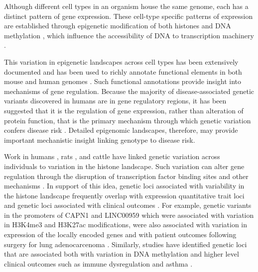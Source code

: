 \documentclass[
  11pt,
]{article}
\begin{document}
Although different cell types in an organism house the same genome, each
has a distinct pattern of gene expression. These cell-type specific
patterns of expression are established through epigenetic modification
of both histones \citep{pmid32671792, pmid29625185} and DNA methylation
\citep{pmid21701563, pmid20720541}, which influence the accessibility of
DNA to transcription machinery
\citep{lawrence2016lateral, jones2012functions, moore2013dna}.

This variation in epigenetic landscapes across cell types has been
extensively documented \citep{pmid21441907, pmid25693563} and has been
used to richly annotate functional elements in both mouse
\citep{stamatoyannopoulos2012encyclopedia, baker2019tissue, yue2014comparative}
and human genomes \citep{pmid25693563, pmid23595227, pmid20657582}. Such
functional annotations provide insight into mechanisms of gene
regulation. Because the majority of disease-associated genetic variants
discovered in humans are in gene regulatory regions, it has been
suggested that it is the regulation of gene expression, rather than
alteration of protein function, that is the primary mechanism through
which genetic variation confers disease risk
\citep{maurano2012systematic, farh2015genetic, pmid21617055, pmid19474294}.
Detailed epigenomic landscapes, therefore, may provide important
mechanistic insight linking genotype to disease risk.

Work in humans \citep{mcvicker2013identification, kang2021genetic}, rats
\citep{rintisch2014natural}, and cattle \citep{prowse2022genetic} have
linked genetic variation across individuals to variation in the histone
landscape. Such variation can alter gene regulation through the
disruption of transcription factor binding sites and other mechanisms
\citep{mcvicker2013identification}. In support of this idea, genetic
loci associated with variability in the histone landscape frequently
overlap with expression quantitative trait loci \citep{kang2021genetic, 
rintisch2014natural, prowse2022genetic} and genetic loci associated with
clinical outcomes \citep{kang2021genetic}. For example, genetic variants
in the promoters of CAPN1 and LINC00959 which were associated with
variation in H3K4me3 and H3K27ac modifications, were also associated
with variation in expression of the locally encoded genes and with
patient outcomes following surgery for lung adenocarcenoma
\citet{kang2021genetic}. Similarly, studies have identified genetic loci
that are associated both with variation in DNA methylation and higher
level clinical outcomes such as immune dysregulation and asthma
\citep{hawe2022genetic}.
\end{document}
